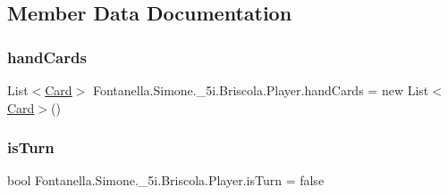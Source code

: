 \subsection{Member Data Documentation}
\hypertarget{class_fontanella_1_1_simone_1_1__5i_1_1_briscola_1_1_player_aea76897ad4738640a6d4a06c553a4453}{}\label{class_fontanella_1_1_simone_1_1__5i_1_1_briscola_1_1_player_aea76897ad4738640a6d4a06c553a4453} 
\subsubsection{\texorpdfstring{hand\+Cards}{handCards}}
{\footnotesize\ttfamily List$<$\hyperlink{class_fontanella_1_1_simone_1_1__5i_1_1_briscola_1_1_card}{Card}$>$ Fontanella.\+Simone.\+\_\+5i.\+Briscola.\+Player.\+hand\+Cards = new List$<$\hyperlink{class_fontanella_1_1_simone_1_1__5i_1_1_briscola_1_1_card}{Card}$>$()}

\hypertarget{class_fontanella_1_1_simone_1_1__5i_1_1_briscola_1_1_player_ad2b525444ebc7aa1baeff6aee7020ad0}{}\label{class_fontanella_1_1_simone_1_1__5i_1_1_briscola_1_1_player_ad2b525444ebc7aa1baeff6aee7020ad0} 
\subsubsection{\texorpdfstring{is\+Turn}{isTurn}}
{\footnotesize\ttfamily bool Fontanella.\+Simone.\+\_\+5i.\+Briscola.\+Player.\+is\+Turn = false}

\hypertarget{class_fontanella_1_1_simone_1_1__5i_1_1_briscola_1_1_player_aa67dff030186e73f9e6ca595db566793}{}\label{class_fontanella_1_1_simone_1_1__5i_1_1_briscola_1_1_player_aa67dff030186e73f9e6ca595db566793} 
